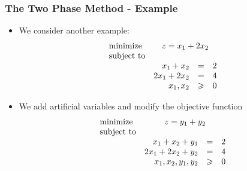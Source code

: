 \documentclass{beamer}
\theoremstyle{plain}
\let\ge\geqslant
\begin{document}
\begin{frame}\frametitle{The Two Phase Method - Example}
\justifying

\begin{itemize}
\justifying

\item We consider another example:
\[ \begin{array}{lrcr}
\textrm{minimize} & \multicolumn{3}{c}{z = x_1 + 2x_2}  \\
\textrm{subject to} & \\
& x_1 + x_2 & = & 2 \\
& 2x_1 + 2x_2 & = & 4 \\
& x_1, x_2 & \ge & 0
\end{array}
\]

\item We add artificial variables and modify the objective function
\[ \begin{array}{lrcr}
\textrm{minimize} & \multicolumn{3}{c}{z = y_1 + y_2}  \\
\textrm{subject to} & \\
& x_1 + x_2 + y_1 & = & 2 \\
& 2x_1 + 2x_2 + y_2 & = & 4 \\
& x_1, x_2, y_1, y_2 & \ge & 0
\end{array}
\]

\end{itemize}

\end{frame}
\end{document}
